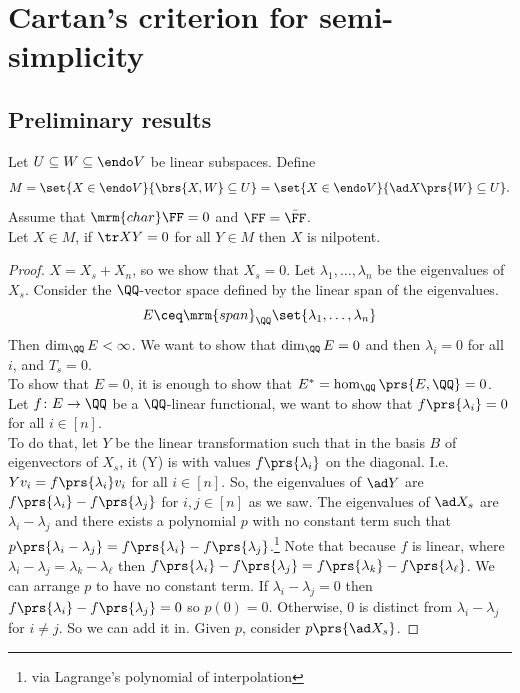 \documentclass[10pt,a4paper,twoside,openany,hidelinks]{book}
\begin{document}
\chapter{Cartan's criterion for semi-simplicity}
\section{Preliminary results}
\begin{proposition}
Let $U\subseteq W \subseteq \endo V$ be linear subspaces.
Define \[M = \set{X \in \endo V}{\brs{X,W} \subseteq U} = \set{X \in \endo V}{\ad X\prs{W} \subseteq U}\text{.}\]
Assume that $\mrm{char}\FF = 0$ and $\FF = \bar{\FF}$. \\
Let $X \in M$, if $\tr XY = 0$ for all $Y \in M$ then $X$ is nilpotent.
\end{proposition}
\begin{proof}
$X = X_s + X_n$, so we show that $X_s = 0$. Let $\lambda_1, \ldots, \lambda_n$ be the eigenvalues of $X_s$. Consider the $\QQ$-vector space defined by the linear span of the eigenvalues.
\begin{align*}
E \ceq \mrm{span}_{\QQ}\set{\lambda_1, \ldots, \lambda_n}
\end{align*}
Then $\dim_{\QQ}E < \infty$.
We want to show that $\dim_{\QQ}E = 0$ and then $\lambda_i = 0$ for all $i$, and $T_s = 0$.\\
To show that $E=0$, it is enough to show that $E^* = \hom_{\QQ}\prs{E, \QQ} = 0$.
Let $f \colon E \to \QQ$ be a $\QQ$-linear functional, we want to show that $f\prs{\lambda_i} = 0$ for all $i \in [n]$.\\
To do that, let $Y$ be the linear transformation such that in the basis $B$ of eigenvectors of $X_s$, it (Y) is with values $f\prs{\lambda_i}$ on the diagonal. I.e. $Yv_i = f\prs{\lambda_i}v_i$ for all $i\in[n]$.
So, the eigenvalues of $\ad Y$ are $f\prs{\lambda_i} - f\prs{\lambda_j}$ for $i,j \in [n]$ as we saw.
The eigenvalues of $\ad X_s$ are $\lambda_i - \lambda_j$ and there exists a polynomial $p$ with no constant term such that $p\prs{\lambda_i - \lambda_j} = f\prs{\lambda_i} - f\prs{\lambda_j}$.\footnote{via Lagrange's polynomial of interpolation}
Note that because $f$ is linear, where $\lambda_i - \lambda_j = \lambda_k - \lambda_{\ell}$ then $f\prs{\lambda_i} - f\prs{\lambda_j} = f\prs{\lambda_k} - f\prs{\lambda_{\ell}}$.
We can arrange $p$ to have no constant term. If $\lambda_i - \lambda_j=0$ then $f\prs{\lambda_i} - f\prs{\lambda_j} = 0$ so $p(0) = 0$. Otherwise, $0$ is distinct from $\lambda_i - \lambda_j$ for $i\neq j$. So we can add it in. Given $p$, consider $p\prs{\ad X_s}$.

\end{proof}
\end{document}
